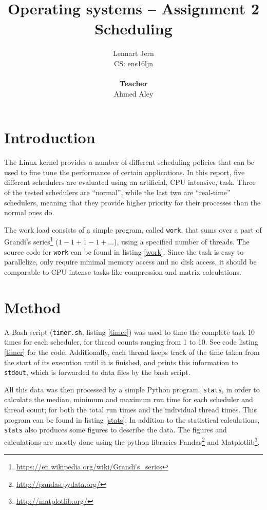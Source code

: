 \documentclass[12pt, a4paper]{article} %
\title{Operating systems -- Assignment 2\\Scheduling}
\author{Lennart Jern\\
	CS: ens16ljn\\ \\ \textbf{Teacher}\\ Ahmed Aley}
\begin{document}
\maketitle

\newpage


\section{Introduction}

The Linux kernel provides a number of different scheduling policies that can be used to fine tune the performance of certain applications.
In this report, five different schedulers are evaluated using an artificial, CPU intensive, task.
Three of the tested schedulers are ``normal'', while the last two are ``real-time'' schedulers, meaning that they provide higher priority for their processes than the normal ones do.

The work load consists of a simple program, called \texttt{work}, that sums over a part of Grandi's series\footnote{\url{https://en.wikipedia.org/wiki/Grandi's_series}} ($1-1+1-1+\dots$), using a specified number of threads.
The source code for \texttt{work} can be found in listing \ref{work}.
Since the task is easy to parallelize, only require minimal memory access and no disk access, it should be comparable to CPU intense tasks like compression and matrix calculations.

\section{Method}

A Bash script (\texttt{timer.sh}, listing \ref{timer}) was used to time the complete task 10 times for each scheduler, for thread counts ranging from 1 to 10.
See code listing \ref{timer} for the code.
Additionally, each thread keeps track of the time taken from the start of its execution until it is finished, and prints this information to \texttt{stdout}, which is forwarded to data files by the bash script.

All this data was then processed by a simple Python program, \texttt{stats}, in order to calculate the median, minimum and maximum run time for each scheduler and thread count; for both the total run times and the individual thread times.
This program can be found in listing \ref{stats}.
In addition to the statistical calculations, \texttt{stats} also produces some figures to describe the data.
The figures and calculations are mostly done using the python libraries Pandas\footnote{\url{http://pandas.pydata.org/}} and Matplotlib\footnote{\url{http://matplotlib.org/}}.
\end{document}
